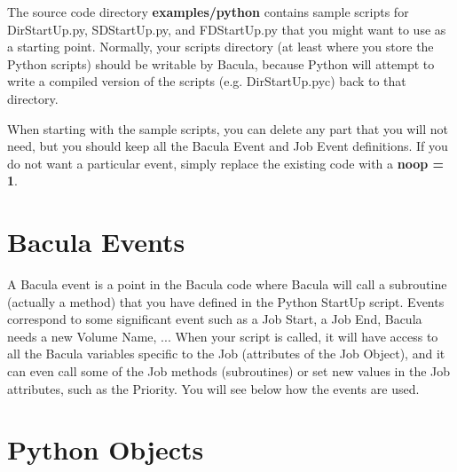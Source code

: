 The source code directory {\bf examples/python} contains sample scripts
for DirStartUp.py, SDStartUp.py, and FDStartUp.py that you might want
to use as a starting point. Normally, your scripts directory (at least
where you store the Python scripts) should be writable by Bacula, because
Python will attempt to write a compiled version of the scripts (e.g.
DirStartUp.pyc) back to that directory.

When starting with the sample scripts, you can delete any part that
you will not need, but you should keep all the Bacula Event and Job Event
definitions.  If you do not want a particular event, simply replace the
existing code with a {\bf noop = 1}.

\section{Bacula Events}
A Bacula event is a point in the Bacula code where Bacula
will call a subroutine (actually a method) that you have 
defined in the Python StartUp script. Events correspond 
to some significant event such as a Job Start, a Job End,
Bacula needs a new Volume Name, ... When your script is
called, it will have access to all the Bacula variables
specific to the Job (attributes of the Job Object), and
it can even call some of the Job methods (subroutines)
or set new values in the Job attributes, such as the 
Priority. You will see below how the events are used.

\section{Python Objects}


